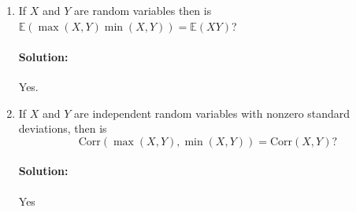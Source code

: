 \documentclass[11pt, notitlepage]{article}
\newcommand{\E}{\mathbb{E}}
\newenvironment{solution}{\paragraph{Solution:}}{\hfill \vspace{10mm}}
\begin{document}
\begin{enumerate}[label=\alph*.)]
	\item If $X$ and $Y$ are random variables then is $\E(\max (X, Y) \min (X, Y)) = \E(X Y)$?
		\begin{solution} Yes.
		
		\end{solution}

	\item If $X$ and $Y$ are independent random variables with nonzero standard deviations, then is $$\text{Corr} (\max (X, Y), \min (X, Y)) = \text{Corr} (X, Y) ?$$
		\begin{solution} 
		Yes
			\end{solution}
\end{enumerate}
\end{document}

